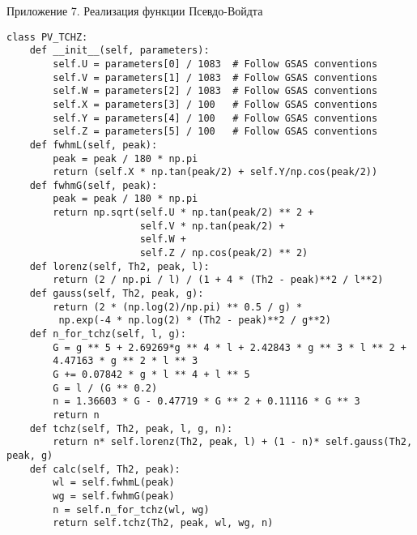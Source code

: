 \begin{center}
Приложение 7. Реализация функции Псевдо-Войдта
\end{center}
\begin{verbatim}
class PV_TCHZ:
    def __init__(self, parameters):
        self.U = parameters[0] / 1083  # Follow GSAS conventions
        self.V = parameters[1] / 1083  # Follow GSAS conventions
        self.W = parameters[2] / 1083  # Follow GSAS conventions
        self.X = parameters[3] / 100   # Follow GSAS conventions
        self.Y = parameters[4] / 100   # Follow GSAS conventions
        self.Z = parameters[5] / 100   # Follow GSAS conventions
    def fwhmL(self, peak):
        peak = peak / 180 * np.pi
        return (self.X * np.tan(peak/2) + self.Y/np.cos(peak/2))
    def fwhmG(self, peak):
        peak = peak / 180 * np.pi
        return np.sqrt(self.U * np.tan(peak/2) ** 2 +
                       self.V * np.tan(peak/2) +
                       self.W +
                       self.Z / np.cos(peak/2) ** 2)
    def lorenz(self, Th2, peak, l):
        return (2 / np.pi / l) / (1 + 4 * (Th2 - peak)**2 / l**2)
    def gauss(self, Th2, peak, g):
        return (2 * (np.log(2)/np.pi) ** 0.5 / g) *
         np.exp(-4 * np.log(2) * (Th2 - peak)**2 / g**2)
    def n_for_tchz(self, l, g):
        G = g ** 5 + 2.69269*g ** 4 * l + 2.42843 * g ** 3 * l ** 2 + 
        4.47163 * g ** 2 * l ** 3
        G += 0.07842 * g * l ** 4 + l ** 5
        G = l / (G ** 0.2)
        n = 1.36603 * G - 0.47719 * G ** 2 + 0.11116 * G ** 3
        return n
    def tchz(self, Th2, peak, l, g, n):
        return n* self.lorenz(Th2, peak, l) + (1 - n)* self.gauss(Th2, peak, g)
    def calc(self, Th2, peak):
        wl = self.fwhmL(peak)
        wg = self.fwhmG(peak)
        n = self.n_for_tchz(wl, wg)
        return self.tchz(Th2, peak, wl, wg, n)
\end{verbatim}
\newpage